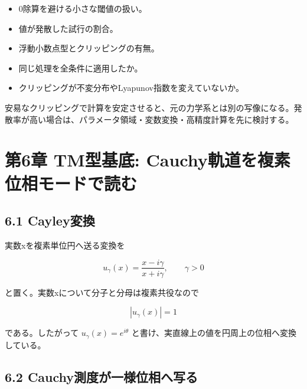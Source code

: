 \documentclass[11pt,a4paper]{ltjsarticle}
\begin{document}
\begin{itemize}

\item 0除算を避ける小さな閾値の扱い。

\item 値が発散した試行の割合。

\item 浮動小数点型とクリッピングの有無。

\item 同じ処理を全条件に適用したか。

\item クリッピングが不変分布やLyapunov指数を変えていないか。

\end{itemize}

安易なクリッピングで計算を安定させると、元の力学系とは別の写像になる。発散率が高い場合は、パラメータ領域・変数変換・高精度計算を先に検討する。\par

\goodbreak

\section*{\textcolor{researchink}{第6章 TM型基底: Cauchy軌道を複素位相モードで読む}}


\subsection*{\textcolor{researchblue}{6.1 Cayley変換}}

実数xを複素単位円へ送る変換を\par

\[
u_{\gamma}(x)=\frac{x-i\gamma}{x+i\gamma},\qquad \gamma>0
\]

と置く。実数xについて分子と分母は複素共役なので\par

\[
|u_{\gamma}(x)|=1
\]

である。したがって \(u_{\gamma}(x)=e^{i\theta}\) と書け、実直線上の値を円周上の位相へ変換している。\par

\subsection*{\textcolor{researchblue}{6.2 Cauchy測度が一様位相へ写る}}
\end{document}
